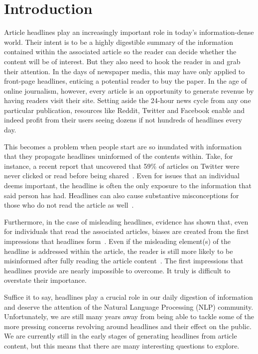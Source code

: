 \section{Introduction}\label{intro}

Article headlines play an increasingly important role in today's information-dense world. Their intent is to be a highly digestible summary of the information contained within the associated article so the reader can decide whether the content will be of interest. But they also need to hook the reader in and grab their attention. In the days of newspaper media, this may have only applied to front-page headlines, enticing a potential reader to buy the paper. In the age of online journalism, however, every article is an opportunity to generate revenue by having readers visit their site. Setting aside the 24-hour news cycle from any one particular publication, resources like Reddit, Twitter and Facebook enable and indeed profit from their users seeing dozens if not hundreds of headlines every day.

This becomes a problem when people start are so inundated with information that they propagate headlines uninformed of the contents within. Take, for instance, a recent report that uncovered that 59\% of articles on Twitter were never clicked or read before being shared~\cite{Gabielkov2016}. Even for issues that an individual deems important, the headline is often the only exposure to the information that said person has had. Headlines can also cause substantive misconceptions for those who do not read the article as well~\cite{Wenzlaff1981}.

Furthermore, in the case of misleading headlines, evidence has shown that, even for individuals that read the associated articles, biases are created from the first impressions that headlines form~\cite{Ecker2014}. Even if the misleading element(s) of the headline is addressed within the article, the reader is still more likely to be misinformed after fully reading the article content~\cite{Ecker2014}. The first impressions that headlines provide are nearly impossible to overcome. It truly is difficult to overstate their importance.

Suffice it to say, headlines play a crucial role in our daily digestion of information and deserve the attention of the Natural Language Processing (NLP) community. Unfortunately, we are still many years away from being able to tackle some of the more pressing concerns revolving around headlines and their effect on the public. We are currently still in the early stages of generating headlines from article content, but this means that there are many interesting questions to explore.

